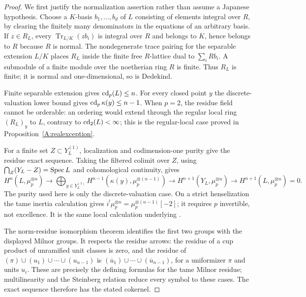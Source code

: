 \begin{proof}
We first justify the normalization assertion rather than assume a
Japanese hypothesis. Choose a $K$-basis $b_1,\ldots,b_d$ of $L$
consisting of elements integral over $R$, by clearing the finitely
many denominators in the equations of an arbitrary basis. If
$z\in R_L$, every $\operatorname{Tr}_{L/K}(zb_i)$ is integral over
$R$ and belongs to $K$, hence belongs to $R$ because $R$ is normal.
The nondegenerate trace pairing for the separable extension $L/K$
places $R_L$ inside the finite free $R$-lattice dual to
$\sum_i Rb_i$. A submodule of a finite module over the noetherian
ring $R$ is finite. Thus $R_L$ is finite; it is normal and
one-dimensional, so is Dedekind.

Finite separable extension gives $\operatorname{cd}_p(L)\leq n$. For every closed
point $y$ the discrete-valuation lower bound gives
$\operatorname{cd}_p\kappa(y)\leq n-1$. When $p=2$, the residue field cannot be
orderable: an ordering would extend through the regular local
ring $(R_L)_y$ to $L$, contrary to $\operatorname{cd}_2(L)<\infty$; this is the
regular-local case proved in Proposition~\ref{A:realexception}.

For a finite set $Z\subset Y_L^{(1)}$, localization and codimension-one
purity give the residue exact sequence. Taking the filtered colimit
over $Z$, using $\bigcap_Z(Y_L-Z)=\operatorname{Spec} L$ and cohomological
continuity, gives
\[
 H^n(L,\mu_p^{\otimes n})\longrightarrow
 \bigoplus_{y\in Y_L^{(1)}}
 H^{n-1}(\kappa(y),\mu_p^{\otimes(n-1)})
 \longrightarrow H^{n+1}(Y_L,\mu_p^{\otimes n})
 \longrightarrow H^{n+1}(L,\mu_p^{\otimes n})=0.
\]
The purity used here is only the discrete-valuation case. On a
strict henselization the tame inertia calculation gives
$i^!\mu_p^{\otimes n}=\mu_p^{\otimes(n-1)}[-2]$; it requires
$p$ invertible, not excellence. It is the same local calculation
underlying \citet[Expos\'e X, Th\'eor\`eme 2.2]{A_SGA4}.

The norm-residue isomorphism theorem
\citep[Theorem 6.16, p.~436]{A_Voevodsky2011} identifies the first
two groups with the displayed Milnor groups. It respects the
residue arrows: the residue of a cup product of unramified unit
classes is zero, and the residue of
$(\pi)\cup(u_1)\cup\cdots\cup(u_{n-1})$ is
$(\overline u_1)\cup\cdots\cup(\overline u_{n-1})$, for a
uniformizer $\pi$ and units $u_i$. These are precisely the defining
formulas for the tame Milnor residue; multilinearity and the
Steinberg relation reduce every symbol to these cases. The
exact sequence therefore has the stated cokernel.
\end{proof}

